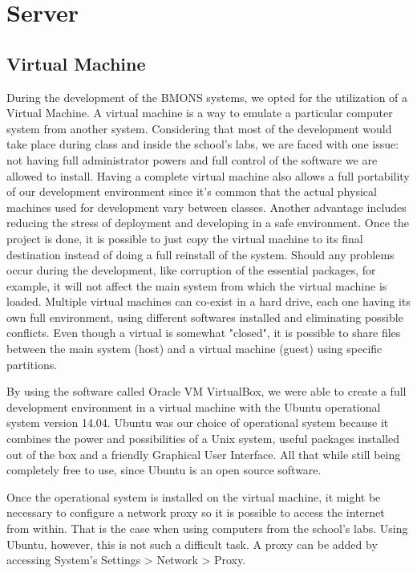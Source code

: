 \chapter{Server}
\section{Virtual Machine}

During the development of the BMONS systems, we opted for the utilization of a Virtual Machine. A virtual machine is a way to emulate a particular computer system from another system. Considering that most of the development would take place during class and inside the school's labs, we are faced with one issue: not having full administrator powers and full control of the software we are allowed to install. Having a complete virtual machine also allows a full portability of our development environment since it's common that the actual physical machines used for development vary between classes. Another advantage includes reducing the stress of deployment and developing in a safe environment. Once the project is done, it is possible to just copy the virtual machine to its final destination instead of doing a full reinstall of the system. Should any problems occur during the development, like corruption of the essential packages, for example, it will not affect the main system from which the virtual machine is loaded. Multiple virtual machines can co-exist in a hard drive, each one having its own full environment, using different softwares installed and eliminating possible conflicts. Even though a virtual is somewhat "closed", it is possible to share files between the main system (host) and a virtual machine (guest) using specific partitions. 

By using the software called Oracle VM VirtualBox, we were able to create a full development environment in a virtual machine with the Ubuntu operational system version 14.04. Ubuntu was our choice of operational system because it combines the power and possibilities of a Unix system, useful packages installed out of the box and a friendly Graphical User Interface. All that while still being completely free to use, since Ubuntu is an open source software. 

Once the operational system is installed on the virtual machine, it might be necessary to configure a network proxy so it is possible to access the internet from within. That is the case when using computers from the school's labs. Using Ubuntu, however, this is not such a difficult task. A proxy can be added by accessing System's Settings > Network > Proxy. 

